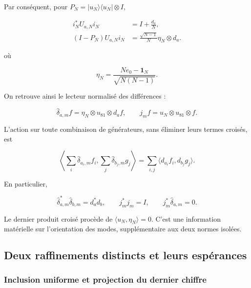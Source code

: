 Par conséquent, pour \(P_N=|u_N\rangle\langle u_N|\otimes I\),

\begin{equation}
\begin{aligned}
i_N^*U_{a,N}i_N&=I+\frac{d_a}{N},\\
(I-P_N)U_{a,N}i_N
&=\frac{\sqrt{N-1}}{N}\eta_N\otimes d_a.
\end{aligned}
\label{gamma-add-display-3}
\end{equation}

où

\begin{equation}
\eta_N=\frac{Ne_0-\mathbf1_N}{\sqrt{N(N-1)}}.
\label{gamma-add-display-4}
\end{equation}

On retrouve ainsi le lecteur normalisé des différences :

\begin{equation}
\widehat\delta_{a,m}f=\eta_N\otimes u_{81}\otimes d_af,
\qquad
j_mf=u_N\otimes u_{81}\otimes f.
\label{gamma-add-display-5}
\end{equation}

L'action sur toute combinaison de générateurs, sans éliminer leurs termes croisés, est

\begin{equation}
\left\langle\sum_i\widehat\delta_{a_i,m}f_i,
                  \sum_j\widehat\delta_{b_j,m}g_j\right\rangle
=\sum_{i,j}\langle d_{a_i}f_i,d_{b_j}g_j\rangle.
\label{gamma-add-display-6}
\end{equation}

En particulier,

\begin{equation}
\widehat\delta_{a,m}^*\widehat\delta_{b,m}=d_a^*d_b,\qquad
j_m^*j_m=I,\qquad
j_m^*\widehat\delta_{a,m}=0.
\label{gamma-add-eq-1}
\end{equation}

Le dernier produit croisé procède de \(\langle u_N,\eta_N\rangle=0\). C'est une information matérielle sur l'orientation des modes, supplémentaire aux deux normes isolées.

\subsection{Deux raffinements distincts et leurs espérances}
\label{gamma-add-sub-108}

\subsubsection{Inclusion uniforme et projection du dernier chiffre}
\label{gamma-add-sub-110}

